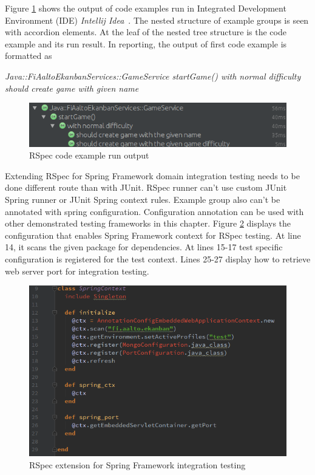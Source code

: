     Figure \ref{fig:rspec-result} shows the output of code examples run in Integrated Development Environment (IDE) \textit{Intellij Idea}~\cite{intellij}.
    The nested structure of example groups
    is seen with accordion elements. At the leaf of the nested tree structure is the code example and its run result. In
    reporting, the output of first code example is formatted as
    \begin{center}
    \textit{Java::FiAaltoEkanbanServices::GameService startGame() with normal difficulty should create game with given name}
    \end{center}
    \restoregeometry

    \begin{figure}[ht]
      \begin{center}
        \includegraphics[width=12.0cm]{images/rspec-result.png}
        \caption{RSpec code example run output}
        \label{fig:rspec-result}
      \end{center}
    \end{figure}

    Extending RSpec for Spring Framework domain integration testing needs to be done different route than with JUnit. RSpec
    runner can't use custom JUnit Spring runner or JUnit Spring context rules. Example group also can't be annotated with
    spring configuration. Configuration annotation can be used with other demonstrated testing frameworks in this chapter. Figure \ref{fig:rspec-config}
    displays the configuration that enables Spring Framework context for RSpec testing. At line 14, it scans the given
    package for dependencies. At lines 15-17 test specific configuration is registered for the test context. Lines 25-27
    display how to retrieve web server port for integration testing.

    \begin{figure}[ht]
      \begin{center}
        \includegraphics[width=12.0cm]{images/rspec-config.png}
        \caption{RSpec extension for Spring Framework integration testing}
        \label{fig:rspec-config}
      \end{center}
    \end{figure}


